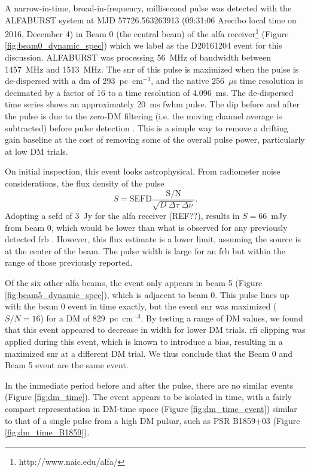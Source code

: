 \documentclass[a4paper,fleqn,usenatbib]{mnras}
\begin{document}
A narrow-in-time, broad-in-frequency, millisecond pulse was detected with the
ALFABURST system at MJD 57726.563263913 (09:31:06 Arecibo local time on 2016,
December 4) in Beam 0 (the central beam) of the \gls{alfa}
receiver\footnote{http://www.naic.edu/alfa/} (Figure
\ref{fig:beam0_dynamic_spec}) which we label as the D20161204 event for this
discussion. ALFABURST was processing 56~MHz of bandwidth between 1457~MHz and
1513~MHz. The \gls{snr} of this pulse is maximized when the pulse is
de-dispersed with a \gls{dm} of 293~pc~cm$^{-3}$, and the native 256~$\mu$s time
resolution is decimated by a factor of 16 to a time resolution of 4.096~ms. The
de-dispersed time series shows an approximately 20~ms \gls{fwhm} pulse.  The dip
before and after the pulse is due to the zero-DM filtering (i.e. the moving
channel average is subtracted) before pulse detection
\citep{2009MNRAS.395..410E}. This is a simple way to remove a drifting gain
baseline at the cost of removing some of the overall pulse power, particularly
at low DM trials.

On initial inspection, this event looks astrophysical. From radiometer noise
considerations, the flux density of the pulse
%
$$
S = \textrm{SEFD} \frac{\textrm{S/N}}{\sqrt{D \; \Delta \tau \;
\Delta \nu}}.
$$
%
Adopting a \gls{sefd} of 3~Jy for the \gls{alfa} receiver (REF??),  results in
\mbox{$S = 66$}~mJy from beam 0, which would be lower than what is observed for
any previously detected \gls{frb} \citep{2016PASA...33...45P}.  However, this
flux estimate is a lower limit, assuming the source is at the center of the
beam. The pulse width is large for an \gls{frb} but within the range of those
previously reported.

Of the six other \gls{alfa} beams, the event only appears in beam 5 (Figure
\ref{fig:beam5_dynamic_spec}), which is adjacent to beam 0.  This pulse lines up
with the beam 0 event in time exactly, but the event \gls{snr} was maximized
($S/N=16$) for a DM of 829~pc~cm$^{-3}$. By testing a range of DM values, we
found that this event appeared to decrease in width for lower DM trials.
\gls{rfi} clipping was applied during this event, which is known to introduce a
bias, resulting in a maximized \gls{snr} at a different DM trial.  We thus
conclude that the Beam 0 and Beam 5 event are the same event.

In the immediate period before and after the pulse, there are no similar events
(Figure \ref{fig:dm_time}). The event appears to be isolated in time, with a
fairly compact representation in DM-time space (Figure \ref{fig:dm_time_event})
similar to that of a single pulse from a high DM pulsar, such as PSR B1859+03
(Figure \ref{fig:dm_time_B1859}).
\end{document}
